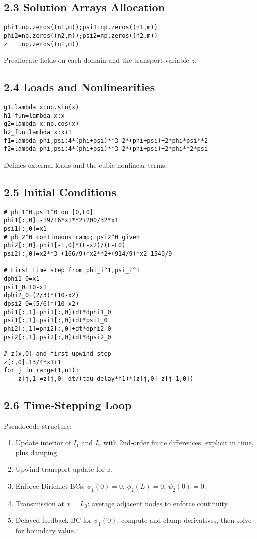\documentclass[a4paper,11pt]{article}
\begin{document}
\subsection*{2.3 Solution Arrays Allocation}
\begin{verbatim}
phi1=np.zeros((n1,m));psi1=np.zeros((n1,m))
phi2=np.zeros((n2,m));psi2=np.zeros((n2,m))
z   =np.zeros((n1,m))
\end{verbatim}
Preallocate fields on each domain and the transport variable \(z\).

\subsection*{2.4 Loads and Nonlinearities}
\begin{verbatim}
g1=lambda x:np.sin(x)
h1_fun=lambda x:x
g2=lambda x:np.cos(x)
h2_fun=lambda x:x+1
f1=lambda phi,psi:4*(phi+psi)**3-2*(phi+psi)+2*phi*psi**2
f2=lambda phi,psi:4*(phi+psi)**3-2*(phi+psi)+2*phi**2*psi
\end{verbatim}
Defines external loads and the cubic nonlinear terms.

\subsection*{2.5 Initial Conditions}
\begin{verbatim}
# phi1^0,psi1^0 on [0,L0]
phi1[:,0]=-19/16*x1**2+200/32*x1
psi1[:,0]=x1
# phi2^0 continuous ramp; psi2^0 given
phi2[:,0]=phi1[-1,0]*(L-x2)/(L-L0)
psi2[:,0]=x2**3-(166/9)*x2**2+(914/9)*x2-1540/9

# First time step from phi_i^1,psi_i^1
dphi1_0=x1
psi1_0=10-x1
dphi2_0=(2/3)*(10-x2)
dpsi2_0=(5/6)*(10-x2)
phi1[:,1]=phi1[:,0]+dt*dphi1_0
psi1[:,1]=psi1[:,0]+dt*psi1_0
phi2[:,1]=phi2[:,0]+dt*dphi2_0
psi2[:,1]=psi2[:,0]+dt*dpsi2_0

# z(x,0) and first upwind step
z[:,0]=13/4*x1+1
for j in range(1,n1):
    z[j,1]=z[j,0]-dt/(tau_delay*h1)*(z[j,0]-z[j-1,0])
\end{verbatim}

\subsection*{2.6 Time‐Stepping Loop}
Pseudocode structure:
\begin{enumerate}
  \item Update interior of \(I_1\) and \(I_2\) with 2nd‑order finite differences, explicit in time, plus damping.
  \item Upwind transport update for \(z\).
  \item Enforce Dirichlet BCs: \(\phi_1(0)=0\), \(\phi_2(L)=0\), \(\psi_2(0)=0\).
  \item Transmission at \(x=L_0\): average adjacent nodes to enforce continuity.
  \item Delayed‐feedback BC for \(\psi_1(0)\): compute and clamp derivatives, then solve for boundary value.
\end{enumerate}
\end{document}
